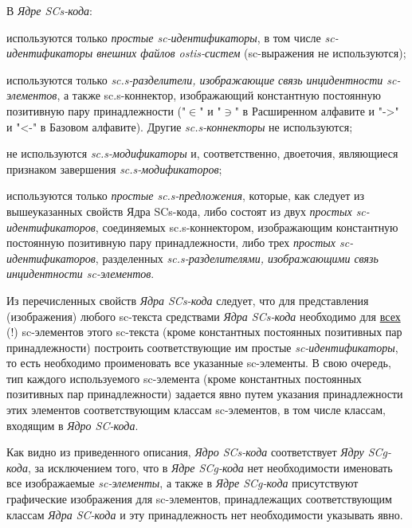 В \textit{Ядре SCs-кода}:
\begin{textitemize}
	\item используются только \textit{простые sc-идентификаторы}, в том числе \textit{sc-идентификаторы внешних файлов ostis-систем} (sc-выражения не используются);
	\item используются только \textit{sc.s-разделители, изображающие связь инцидентности sc-элементов}, а также sc.s-коннектор, изображающий константную  постоянную позитивную пару принадлежности ("$\in$"{} и "$\ni$"{} в Расширенном алфавите и "{}->{}"{} и "{}<-{}"{} в Базовом алфавите). Другие \textit{sc.s-коннекторы} не используются;
	\item не используются \textit{sc.s-модификаторы} и, соответственно, двоеточия, являющиеся признаком завершения \textit{sc.s-модификаторов};
	\item используются только \textit{простые sc.s-предложения}, которые, как следует из вышеуказанных свойств Ядра SCs-кода, либо состоят из двух \textit{простых sc-идентификаторов}, соединяемых sc.s-коннектором, изображающим константную  постоянную позитивную пару принадлежности, либо трех \textit{простых sc-идентификаторов}, разделенных \textit{sc.s-разделителями, изображающими связь инцидентности sc-элементов}.
\end{textitemize}

Из перечисленных свойств \textit{Ядра SCs-кода} следует, что для представления (изображения) любого \mbox{sc-текста} средствами \textit{Ядра SCs-кода} необходимо для \uline{всех} (!) sc-элементов этого \mbox{sc-текста} (кроме константных постоянных позитивных пар принадлежности) построить соответствующие им простые \textit{sc-идентификаторы}, то есть необходимо проименовать все указанные sc-элементы. В свою очередь, тип каждого используемого \mbox{sc-элемента} (кроме константных постоянных позитивных пар принадлежности) задается явно путем указания принадлежности этих элементов соответствующим классам sc-элементов, в том числе классам, входящим в \textit{Ядро SC-кода}.

Как видно из приведенного описания, \textit{Ядро SCs-кода} соответствует \textit{Ядру SCg-кода}, за исключением того, что в \textit{Ядре SCg-кода} нет необходимости именовать все изображаемые \textit{sc-элементы}, а также в\textit{ Ядре SCg-кода} присутствуют графические изображения для sc-элементов, принадлежащих соответствующим классам \textit{Ядра SC-кода} и эту принадлежность нет необходимости указывать явно.

